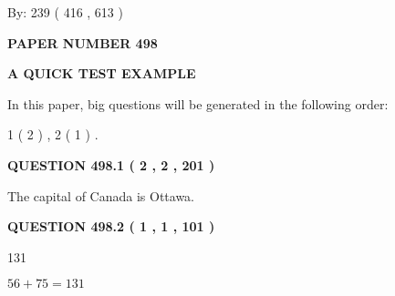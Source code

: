 \documentclass[12pt]{article}
\begin{document}
   
\hspace{1.0in} By: 
 239 ( 416 ,  613 )
   
   
   
   
\newpage 
\setcounter{page}{ 
   498001 } 
   
   
   
   
 {\textbf{ \Large{ PAPER NUMBER  498  }}}
   
   
\vspace{0.2in}
   
   
   
   
   
   
 \vspace{0.2in}
{\LARGE {\textbf{ A QUICK TEST EXAMPLE}}}
   
   
   
\vspace{0.2in}
   
In this paper, big questions will be generated in the following order: 
   
   
   1 ( 2 )
 ,
   2 ( 1 )
 .
  
\vspace{0.2in}
  
{\textbf{\Large{QUESTION
498.1 
 ( 2 , 2 , 201 )
}}}
  
  
 
 
\noindent{}
 
 
The capital of Canada is Ottawa.
 
 
 
 
  
\vspace{0.2in}
  
{\textbf{\Large{QUESTION
498.2 
 ( 1 , 1 , 101 )
}}}
  
  
 
 
\noindent{}

131
 
 
 
 
\noindent{}

$ %
56 +  %
75=   %
131$
 
 
   
   
 \vspace{0.2in}
 
\end{document}
